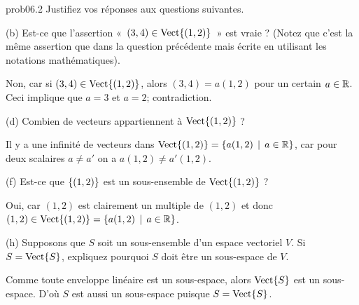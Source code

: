 \bigskip
\begin{sol}{prob06.2}  Justifiez vos réponses aux questions suivantes.

\medskip
(b) Est-ce que l'assertion «~$(3,4) \in\sp{(1,2)} $~» est vraie ? (Notez que c'est la même assertion que dans la question précédente mais écrite en utilisant les notations mathématiques).

\soln Non, car si $(3,4) \in\sp{(1,2)} $, alors $(3,4)=a (1,2)$ pour un certain $a\in \R$. Ceci implique que $a=3$ et $a=2$; contradiction.
\medskip

(d) Combien de vecteurs appartiennent à $\sp{(1,2)}$ ?

\soln Il y a une infinit\'e de vecteurs dans $\sp{(1,2)}= \set{a(1,2)\st a\in \R}$, car pour deux scalaires $a\not= a'$ on a $a(1,2)\not=a'(1,2)$.

\medskip

(f) Est-ce que $\set{(1,2)}$ est un sous-ensemble de $\sp{(1,2)}$ ?

\soln Oui, car $(1,2)$ est clairement un multiple de $(1,2)$ et donc $(1,2) \in \sp{(1,2)} =\set{a(1,2)\st a\in \R}$.
\medskip

(h)  Supposons que $S$ soit un sous-ensemble d'un espace vectoriel $V$.  Si $S= \sp{S}$, expliquez pourquoi $S$ doit être un sous-espace de $V$.  

\soln Comme toute enveloppe lin\'eaire est  un sous-espace, alors $\sp{S}$ est un sous-espace. D'où $S$ est aussi un sous-espace puisque $S=\sp{S}$.  
\medskip





\end{sol}

